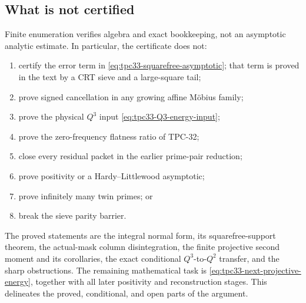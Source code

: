 \subsection{What is not certified}

Finite enumeration verifies algebra and exact bookkeeping, not an
asymptotic analytic estimate.  In particular, the certificate does not:
\begin{enumerate}[label=\textup{(\roman*)}]
 \item certify the error term in
 \eqref{eq:tpc33-squarefree-asymptotic}; that term is proved in the text by
 a CRT sieve and a large-square tail;
 \item prove signed cancellation in any growing affine M\"obius family;
 \item prove the physical \(Q^3\) input
 \eqref{eq:tpc33-Q3-energy-input};
 \item prove the zero-frequency flatness ratio of TPC-32;
 \item close every residual packet in the earlier prime-pair reduction;
 \item prove positivity or a Hardy--Littlewood asymptotic;
 \item prove infinitely many twin primes; or
 \item break the sieve parity barrier.
\end{enumerate}

The proved statements are the integral normal form, its squarefree-support
theorem, the actual-mask column disintegration, the finite projective second
moment and its corollaries, the exact conditional \(Q^3\)-to-\(Q^2\)
transfer, and the sharp obstructions.  The remaining mathematical task is
\eqref{eq:tpc33-next-projective-energy}, together with all later positivity
 and reconstruction stages.  This delineates the proved, conditional, and
 open parts of the argument.
